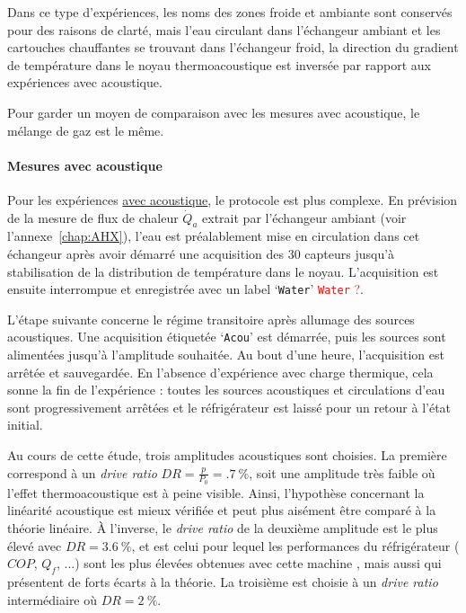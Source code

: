 Dans ce type d'expériences, les noms des zones \og froide \fg{} et \og ambiante \fg{} sont conservés pour des raisons de clarté, mais l'eau circulant dans l'échangeur ambiant et les cartouches chauffantes se trouvant dans l'échangeur froid, la direction du gradient de température dans le noyau thermoacoustique est inversée par rapport aux expériences avec acoustique. %

Pour garder un moyen de comparaison avec les mesures avec acoustique, le mélange de gaz est le même.

\paragraph{Mesures avec acoustique}\label{chap:MesureAvecAcou} Pour les expériences \underline{avec acoustique}, le protocole est plus complexe. En prévision de la mesure de flux de chaleur $\dot Q_a$ extrait par l'échangeur ambiant (voir l'annexe~\ref{chap:AHX}), l'eau est préalablement mise en circulation dans cet échangeur après avoir démarré une acquisition des 30 capteurs jusqu'à stabilisation de la distribution de température dans le noyau. L'acquisition est ensuite interrompue et enregistrée avec un label `\texttt{Water}' \textcolor{red}{\og \texttt{Water} \fg{} ?}.

L'étape suivante concerne le régime transitoire après allumage des sources acoustiques. Une acquisition étiquetée `\texttt{Acou}' est démarrée, puis les sources sont alimentées jusqu'à l'amplitude souhaitée. Au bout d'une heure, l'acquisition est arrêtée et sauvegardée. En l'absence d'expérience avec charge thermique, cela sonne la fin de l'expérience : toutes les sources acoustiques et circulations d'eau sont progressivement arrêtées et le réfrigérateur est laissé pour un retour à l'état initial. 

Au cours de cette étude, trois amplitudes acoustiques sont choisies. La première correspond à un \textit{drive ratio} $DR=\frac{p}{P_0}=\qty{.7}{\percent}$, soit une amplitude très faible où l'effet thermoacoustique est à peine visible. Ainsi, l'hypothèse concernant la linéarité acoustique est mieux vérifiée et peut plus aisément être comparé à la théorie linéaire. À l'inverse, le \textit{drive ratio} de la deuxième amplitude est le plus élevé avec $DR=\qty{3.6}{\percent}$, et est celui pour lequel les performances du réfrigérateur ($COP$, $Q_f$, ...) sont les plus élevées obtenues avec cette machine \cite{ramadan_design_2021}, mais aussi qui présentent de forts écarts à la théorie. La troisième est choisie à un \textit{drive ratio} intermédiaire où $DR=\qty{2}{\percent}$. 

